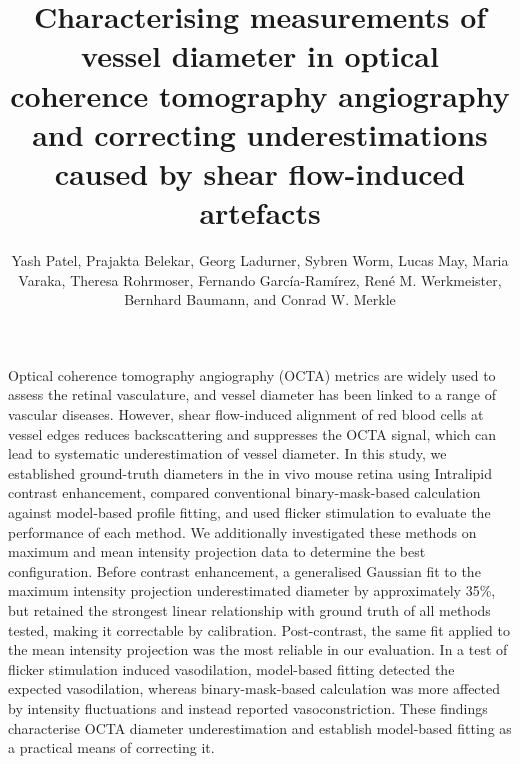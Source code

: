 \documentclass{optica-article}
\begin{document}
\title{Characterising measurements of vessel diameter in optical coherence tomography angiography and correcting underestimations caused by shear flow-induced artefacts}

\author{Yash Patel, Prajakta Belekar, Georg Ladurner, Sybren Worm, Lucas May, Maria Varaka, Theresa Rohrmoser, Fernando Garc\'{i}a-Ram\'{i}rez, Ren\'{e} M. Werkmeister, Bernhard Baumann, and Conrad W. Merkle}

\address{Center for Medical Physics and Biomedical Engineering, Medical University of Vienna, Währinger Gürtel 18-20/4L, 1090 Vienna, Austria\\
Institute of Biomedical Physics, Medical University of Innsbruck, Müllerstraße 44, 6020 Innsbruck, Austria}


\begin{abstract*} 

Optical coherence tomography angiography (OCTA) metrics are widely used to assess the retinal vasculature, and vessel diameter has been linked to a range of vascular diseases. However, shear flow-induced alignment of red blood cells at vessel edges reduces backscattering and suppresses the OCTA signal, which can lead to systematic underestimation of vessel diameter. In this study, we established ground-truth diameters in the in vivo mouse retina using Intralipid contrast enhancement, compared conventional binary-mask-based calculation against model-based profile fitting, and used flicker stimulation to evaluate the performance of each method. We additionally investigated these methods on maximum and mean intensity projection data to determine the best configuration. Before contrast enhancement, a generalised Gaussian fit to the maximum intensity projection underestimated diameter by approximately 35\%, but retained the strongest linear relationship with ground truth of all methods tested, making it correctable by calibration. Post-contrast, the same fit applied to the mean intensity projection was the most reliable in our evaluation. In a test of flicker stimulation induced vasodilation, model-based fitting detected the expected vasodilation, whereas binary-mask-based calculation was more affected by intensity fluctuations and instead reported vasoconstriction. These findings characterise OCTA diameter underestimation and establish model-based fitting as a practical means of correcting it.

\end{abstract*}
\end{document}
